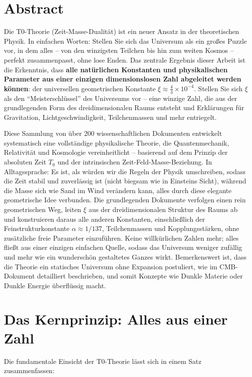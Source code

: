 \section*{Abstract}
		Die T0-Theorie (Zeit-Masse-Dualität) ist ein neuer Ansatz in der theoretischen Physik. In einfachen Worten: Stellen Sie sich das Universum als ein großes Puzzle vor, in dem alles – von den winzigsten Teilchen bis hin zum weiten Kosmos – perfekt zusammenpasst, ohne lose Enden. Das zentrale Ergebnis dieser Arbeit ist die Erkenntnis, dass \textbf{alle natürlichen Konstanten und physikalischen Parameter aus einer einzigen dimensionslosen Zahl abgeleitet werden können}: der universellen geometrischen Konstante $\xi \approx \frac{4}{3} \times 10^{-4}$. Stellen Sie sich $\xi$ als den ``Meisterschlüssel'' des Universums vor – eine winzige Zahl, die aus der grundlegenden Form des dreidimensionalen Raums entsteht und Erklärungen für Gravitation, Lichtgeschwindigkeit, Teilchenmassen und mehr entriegelt.
		
		Diese Sammlung von über 200 wissenschaftlichen Dokumenten entwickelt systematisch eine vollständige physikalische Theorie, die Quantenmechanik, Relativität und Kosmologie vereinheitlicht – basierend auf dem Prinzip der absoluten Zeit $T_0$ und der intrinsischen Zeit-Feld-Masse-Beziehung. In Alltagssprache: Es ist, als würden wir die Regeln der Physik umschreiben, sodass die Zeit stabil und zuverlässig ist (nicht biegsam wie in Einsteins Sicht), während die Masse sich wie Sand im Wind verändern kann, alles durch diese elegante geometrische Idee verbunden. Die grundlegenden Dokumente verfolgen einen rein geometrischen Weg, leiten $\xi$ aus der dreidimensionalen Struktur des Raums ab und konstruieren daraus alle anderen Konstanten, einschließlich der Feinstrukturkonstante $\alpha \approx 1/137$, Teilchenmassen und Kopplungsstärken, ohne zusätzliche freie Parameter einzuführen. Keine willkürlichen Zahlen mehr; alles fließt aus einer einzigen einfachen Quelle, sodass das Universum weniger zufällig und mehr wie ein wunderschön gestaltetes Ganzes wirkt. Bemerkenswert ist, dass die Theorie ein statisches Universum ohne Expansion postuliert, wie im CMB-Dokument detailliert beschrieben, und somit Konzepte wie Dunkle Materie oder Dunkle Energie überflüssig macht.

	
	\section{Das Kernprinzip: Alles aus einer Zahl}
	
	Die fundamentale Einsicht der T0-Theorie lässt sich in einem Satz zusammenfassen:
	
